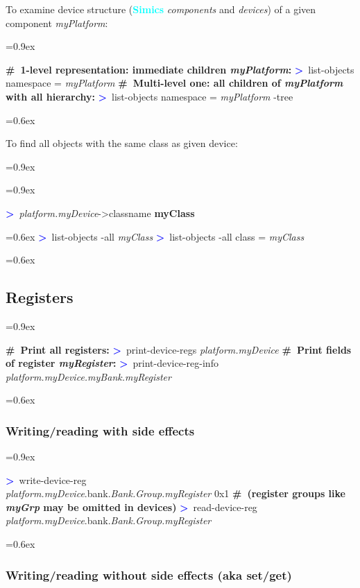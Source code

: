 \documentclass[8pt]{extarticle}
\DeclareRobustCommand{\bseries}{\fontseries{b}\selectfont}
\newenvironment{code}[1][]{%
\begin{prebox}[#1]\obeylines%
\fontdimen2\font=0.9ex%
}{%
\end{prebox}%
\fontdimen2\font=0.6ex%
}
\newcommand{\ind}{\hphantom{~~~}}
\newcommand{\sprompt}{\textcolor{blue}{\textbf{>}\ }}
\newcommand{\cmtcommon}[1]{\textcolor{Sepia}{\textbf{#1}}}
\newcommand{\cmt}[1]{\cmtcommon{\#\ #1}}
\newcommand{\p}[1]{\textit{\large#1}}
\newcommand{\lbreak}{\hfill\textcolor{red}{\Large \raisebox{-0.2em}{$↩$}}\\\ind}
\newcommand{\condbreak}{\lbreak}
\newcommand{\condbreak}{}
\newcommand{\Simics}{\textcolor{cyan}{\textbf{Simics}}}
\begin{document}
\begin{multicols*}{3}
To examine device structure (\Simics{} \textit{components}
and \textit{devices}) of a given component \p{myPlatform}:
\begin{code}
    \cmt{1-level representation: immediate children \p{myPlatform}:}
    \sprompt list-objects namespace = \p{myPlatform}
    \cmt{Multi-level one: all children of \p{myPlatform} with all hierarchy:}
    \sprompt list-objects namespace = \p{myPlatform} -tree
\end{code}

To find all objects with the same class as given device:
        \begin{code}
            \begin{code}
            \sprompt \p{platform.myDevice}->classname
            \textbf{myClass}
            \end{code}
            \sprompt list-objects -all \p{myClass}
            \sprompt list-objects -all class = \p{myClass}
        \end{code}

\subsection{Registers}
\begin{code}
    \cmt{Print all registers:}
    \sprompt print-device-regs \p{platform.myDevice}
    \cmt{Print fields of register \p{myRegister}:}
    \sprompt print-device-reg-info \condbreak \p{platform.myDevice.myBank.myRegister}
\end{code}

\subsubsection{Writing/reading with side effects}

\begin{code}
    \sprompt write-device-reg \lbreak \p{platform.myDevice}.bank.\p{Bank.Group.myRegister} 0x1
    \cmt{(register groups like \p{myGrp} may be omitted in devices)}
    \sprompt read-device-reg \condbreak \p{platform.myDevice}.bank.\p{Bank.Group.myRegister}
\end{code}

\subsubsection{Writing/reading {\bseries without} side effects (aka set/get)}


\end{multicols*}
\end{document}
